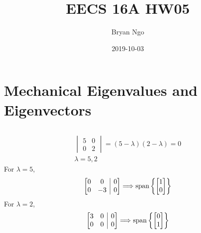 \documentclass[]{article}
\title{EECS 16A HW05}
\author{Bryan Ngo}
\date{2019-10-03}
\numberwithin{equation}{section}
\newcommand{\Span}[1]{\operatorname{span}\left\lbrace{#1}\right\rbrace}
\begin{document}
\maketitle

\section{Mechanical Eigenvalues and Eigenvectors}

\subsection{}

\begin{gather}
	\begin{vmatrix}
	5 & 0 \\
	0 & 2
	\end{vmatrix}
	= (5 - \lambda)(2 - \lambda) = 0 \\
	\lambda = 5, 2
\end{gather}
For \(\lambda = 5\), 
\begin{gather}
	\left[\begin{array}{@{}cc|c@{}}
	0 & 0 & 0 \\
	0 & -3 & 0
	\end{array}\right]
	\Longrightarrow
	\Span{\begin{bmatrix}
	1 \\
	0
	\end{bmatrix}}
\end{gather}
For \(\lambda = 2\), 
\begin{gather}
	\left[\begin{array}{@{}cc|c@{}}
	3 & 0 & 0 \\
	0 & 0 & 0
	\end{array}\right]
	\Longrightarrow
	\Span{\begin{bmatrix}
	0 \\
	1
	\end{bmatrix}}
\end{gather}

\subsection{}
\end{document}
